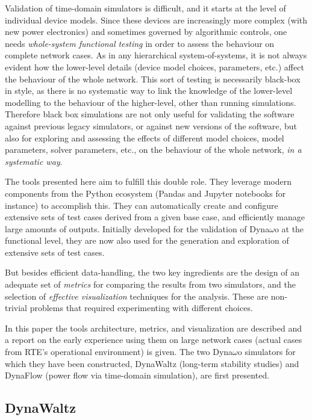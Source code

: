 \documentclass[conference]{IEEEtran}
\begin{document}
Validation of time-domain simulators is difficult, and it starts at the level
of individual device models. Since these devices are increasingly more
complex (with new power electronics) and sometimes governed by
algorithmic controls, one needs \emph{whole-system functional testing} in order
to assess the behaviour on complete network cases. As in any hierarchical
system-of-systems, it is not always evident how the lower-level details (device
model choices, parameters, etc.)  affect the behaviour of the whole network. This
sort of testing is necessarily black-box in style, as there is no systematic
way to link the knowledge of the lower-level modelling to the behaviour of the
higher-level, other than running simulations.  Therefore black box
simulations are not only useful for validating the software against previous
legacy simulators, or against new versions of the software, but also for
exploring and assessing the effects of different model choices, model
parameters, solver parameters, etc., on the behaviour of the whole network,
\emph{in a systematic way}.

The tools presented here aim to fulfill this double role. They leverage modern
components from the Python ecosystem (Pandas and Jupyter notebooks for instance) to accomplish this. They can automatically create and configure
extensive sets of test cases derived from a given base case, and efficiently
manage large amounts of outputs. Initially developed for the validation of
Dyna$\omega$o at the functional level, they are now also used for the generation and
exploration of extensive sets of test cases.

But besides efficient data-handling, the two key ingredients are the design of
an adequate set of \emph{metrics} for comparing the results from two simulators,
and the selection of \emph{effective visualization} techniques for the analysis.
These are non-trivial problems that required experimenting with different
choices.

In this paper the tools architecture, metrics, and visualization are described and a report on the early experience using them on large network cases
(actual cases from RTE's operational environment) is given. The two
Dyna$\omega$o simulators for which they have been constructed, DynaWaltz (long-term
stability studies) and DynaFlow (power flow via time-domain simulation), are first presented.



\subsection{DynaWaltz}
\end{document}
